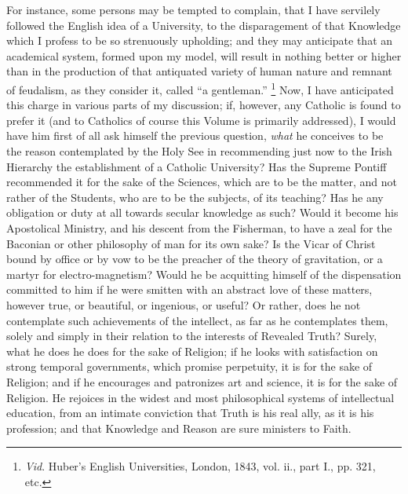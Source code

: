 For instance, some persons may be tempted to complain, that I have
servilely followed the English idea of a University, to the
disparagement of that Knowledge which I profess to be so strenuously
upholding; and they may anticipate that an academical system, formed
upon my model, will result in nothing better or higher than in the
production of that antiquated variety of human nature and remnant of
feudalism, as they consider it, called ``a gentleman.'' \footnote{\emph{Vid}. Huber's English Universities, London, 1843, vol. ii.,
part I., pp. 321, etc.} Now, I have anticipated this charge in various parts of my
discussion; if, however, any Catholic is found to prefer it (and to
Catholics of course this Volume is primarily addressed), I would have
him first of all ask himself the previous question, \emph{what} he
conceives to be the reason contemplated by the Holy See in recommending
just now to the Irish Hierarchy the establishment of a Catholic
University? Has the Supreme Pontiff recommended it for the sake of the
Sciences, which are to be the matter, and not rather of the Students,
who are to be the subjects, of its teaching? Has he any obligation or
duty at all towards secular knowledge as such? Would it become his
Apostolical Ministry, and his descent from the Fisherman, to have a zeal
for the Baconian or other philosophy of man for its own sake? Is
the Vicar of Christ bound by office or by vow to be the preacher of the
theory of gravitation, or a martyr for electro-magnetism? Would he be
acquitting himself of the dispensation committed to him if he were
smitten with an abstract love of these matters, however true, or
beautiful, or ingenious, or useful? Or rather, does he not contemplate
such achievements of the intellect, as far as he contemplates them,
solely and simply in their relation to the interests of Revealed Truth?
Surely, what he does he does for the sake of Religion; if he looks with
satisfaction on strong temporal governments, which promise perpetuity,
it is for the sake of Religion; and if he encourages and patronizes art
and science, it is for the sake of Religion. He rejoices in the widest
and most philosophical systems of intellectual education, from an
intimate conviction that Truth is his real ally, as it is his
profession; and that Knowledge and Reason are sure ministers to Faith.

